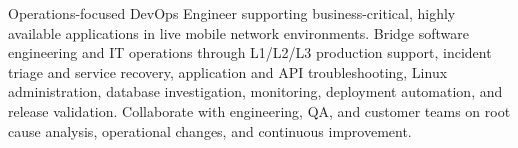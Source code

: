 Operations-focused DevOps Engineer supporting business-critical, highly available
applications in live mobile network environments. Bridge software engineering and
IT operations through L1/L2/L3 production support, incident triage and service
recovery, application and API troubleshooting, Linux administration, database
investigation, monitoring, deployment automation, and release validation.
Collaborate with engineering, QA, and customer teams on root cause analysis,
operational changes, and continuous improvement.\par
